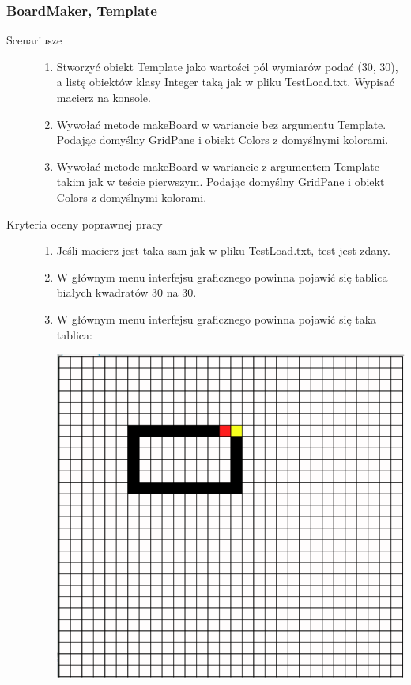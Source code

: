 \documentclass[a4paper,11pt]{article}
\begin{document}
\subsubsection{BoardMaker, Template}
\begin{description}

\item[Scenariusze] \hfill
\begin{enumerate}
\item Stworzyć obiekt Template jako wartości pól wymiarów podać (30, 30), a listę obiektów klasy Integer taką jak w pliku TestLoad.txt. Wypisać macierz na konsole.
\item Wywołać metode makeBoard w wariancie bez argumentu Template. Podając domyślny GridPane i obiekt Colors z domyślnymi kolorami.
\item Wywołać metode makeBoard w wariancie z argumentem Template takim jak w teście pierwszym. Podając domyślny GridPane i obiekt Colors z domyślnymi kolorami.

\end{enumerate}

\item[Kryteria oceny poprawnej pracy] \hfill
\begin{enumerate}
\item Jeśli macierz jest taka sam jak w pliku TestLoad.txt, test jest zdany.
\item W głównym menu interfejsu graficznego powinna pojawić się tablica białych kwadratów 30 na 30.
\item W głównym menu interfejsu graficznego powinna pojawić się taka tablica:

\includegraphics[width=\textwidth]{TestGUI2}
\end{enumerate}

\end{description}
\end{document}

